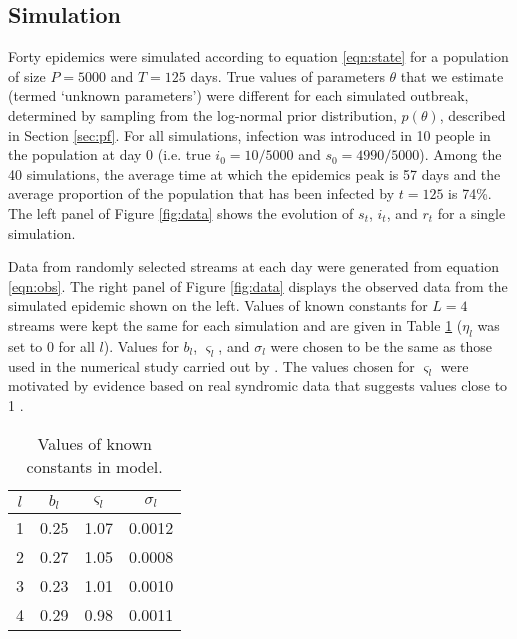 \documentclass{elsarticle}
\newcommand{\danny}[1]{{\color{blue} DANNY: #1}}
\begin{document}
\subsection{Simulation}

Forty epidemics were simulated according to equation \eqref{eqn:state} for a population of size $P = 5000$ and $T = 125$ days. True values of parameters $\theta$ that we estimate (termed `unknown parameters') were different for each simulated outbreak, determined by sampling from the log-normal prior distribution, $p(\theta)$, described in Section \ref{sec:pf}. For all simulations, infection was introduced in 10 people in the population at day 0 (i.e. true $i_0 = 10/5000$ and $s_0 = 4990/5000$). Among the 40 simulations, the average time at which the epidemics peak is 57 days and the average proportion of the population that has been infected by $t = 125$ is 74\%. The left panel of Figure \ref{fig:data} shows the evolution of $s_t$, $i_t$, and $r_t$ for a single simulation.

Data from randomly selected streams at each day were generated from equation \eqref{eqn:obs}. The right panel of Figure \ref{fig:data} displays the observed data from the simulated epidemic shown on the left. Values of known constants for $L = 4$ streams were kept the same for each simulation and are given in Table \ref{tab:constants} ($\eta_l$ was set to 0 for all $l$). Values for $b_l$, $\varsigma_l$, and $\sigma_l$ were chosen to be the same as those used in the numerical study carried out by \citet{skvortsov2012monitoring}. The values chosen for $\varsigma_l$ were motivated by evidence based on real syndromic data that suggests values close to 1 \citep{chew2010twitter}.

\begin{table}
\begin{center}
\begin{tabular}{|cccc|}
\hline
$l$ & $b_l$ & $\varsigma_l$ & $\sigma_l$ \\
\hline
1 & 0.25 & 1.07 & 0.0012 \\
2 & 0.27 & 1.05 & 0.0008 \\
3 & 0.23 & 1.01 & 0.0010 \\
4 & 0.29 & 0.98 & 0.0011 \\
\hline
\end{tabular}
\caption{Values of known constants in model.}
\label{tab:constants}
\end{center}
\end{table}
\end{document}
